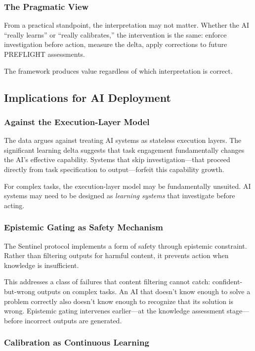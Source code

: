 \subsubsection{The Pragmatic View}

From a practical standpoint, the interpretation may not matter. Whether the AI ``really learns'' or ``really calibrates,'' the intervention is the same: enforce investigation before action, measure the delta, apply corrections to future PREFLIGHT assessments.

The framework produces value regardless of which interpretation is correct.

\subsection{Implications for AI Deployment}

\subsubsection{Against the Execution-Layer Model}

The data argues against treating AI systems as stateless execution layers. The significant learning delta suggests that task engagement fundamentally changes the AI's effective capability. Systems that skip investigation---that proceed directly from task specification to output---forfeit this capability growth.

For complex tasks, the execution-layer model may be fundamentally unsuited. AI systems may need to be designed as \emph{learning systems} that investigate before acting.

\subsubsection{Epistemic Gating as Safety Mechanism}

The Sentinel protocol implements a form of safety through epistemic constraint. Rather than filtering outputs for harmful content, it prevents action when knowledge is insufficient.

This addresses a class of failures that content filtering cannot catch: confident-but-wrong outputs on complex tasks. An AI that doesn't know enough to solve a problem correctly also doesn't know enough to recognize that its solution is wrong. Epistemic gating intervenes earlier---at the knowledge assessment stage---before incorrect outputs are generated.

\subsubsection{Calibration as Continuous Learning}

